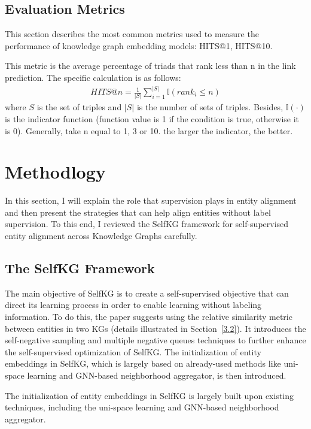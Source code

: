 \documentclass[sigconf]{acmart}
\begin{document}
{\subsection{Evaluation Metrics}
This section describes the most common metrics used to measure the performance of knowledge graph embedding models: HITS@1, HITS@10.

This metric is the average percentage of triads that rank less than n in the link prediction. The specific calculation is as follows:
\begin{gather}
    HITS@n=\frac{1}{\left | S \right |} \sum _{i=1}^{\left | S \right |}\mathbb{I}(rank_i\le n) 
\end{gather}
where $S$ is the set of triples and $\left | S \right |$ is the number of sets of triples. Besides, $\mathbb{I}(\cdot)$ is the indicator function (function value is 1 if the condition is true, otherwise it is 0). Generally, take n equal to 1, 3 or 10. the larger the indicator, the better.
\section{Methodlogy}
In this section, I will explain the role that supervision plays in entity alignment and then present the strategies that can help align entities without label supervision. To this end, I reviewed the SelfKG framework for self-supervised entity alignment across Knowledge Graphs carefully.
\subsection{The SelfKG Framework}
The main objective of SelfKG is to create a self-supervised objective that can direct its learning process in order to enable learning without labeling information. To do this, the paper suggests using the relative similarity metric between entities in two KGs (details illustrated in Section~\ref{3.2}). It introduces the self-negative sampling and multiple negative queues techniques to further enhance the self-supervised optimization of SelfKG. The initialization of entity embeddings in SelfKG, which is largely based on already-used methods like uni-space learning and GNN-based neighborhood aggregator, is then introduced.

The initialization of entity embeddings in SelfKG is largely built upon existing techniques, including the uni-space learning and GNN-based neighborhood aggregator.
}
\end{document}

